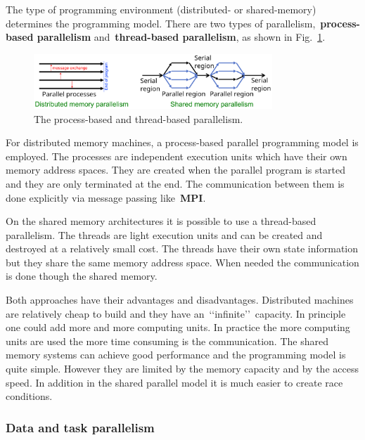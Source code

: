 \par
The type of programming environment (distributed- or shared-memory) determines the programming model.
There are two types of parallelism,~\textbf{process-based parallelism} and~\textbf{thread-based parallelism}, as shown in Fig.~\ref{fig:process_thread_parallelism}.


\begin{figure}[!h]
\centering\includegraphics[width=0.8\textwidth]{fig_hardware/process_thread_parallelism.png}
\caption{The process-based and thread-based parallelism.}\label{fig:process_thread_parallelism}
\end{figure}


\par
For distributed memory machines, a process-based parallel programming model is employed.
The processes are independent execution units which have their own memory address spaces.
They are created when the parallel program is started and they are only terminated at the end.
The communication between them is done explicitly via message passing like~\textbf{MPI}.


\par
On the shared memory architectures it is possible to use a thread-based parallelism.
The threads are light execution units and can be created and destroyed at a relatively small cost.
The threads have their own state information but they share the same memory address space.
When needed the communication is done though the shared memory.


\par
Both approaches have their advantages and disadvantages.
Distributed machines are relatively cheap to build and they have an~\lq\lq infinite\rq\rq~capacity.
In principle one could add more and more computing units.
In practice the more computing units are used the more time consuming is the communication.
The shared memory systems can achieve good performance and the programming model is quite simple.
However they are limited by the memory capacity and by the access speed.
In addition in the shared parallel model it is much easier to create race conditions.


\subsubsection{Data and task parallelism}

